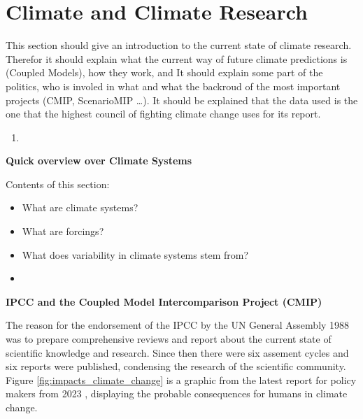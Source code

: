 \section{Climate and Climate Research}
\label{sec:climate}

This section should give an introduction to the current state of climate research. 
Therefor it should explain what the current way of future climate predictions is (Coupled Models), how they work, and 
It should explain some part of the politics, who is involed in what and what the backroud of the most important projects (CMIP, ScenarioMIP \dots). 
It should be explained that the data used is the one that the highest council of fighting climate change uses for its report. 

\begin{enumerate}
  \item
  
\end{enumerate}


\textbf{Quick overview over Climate Systems}

Contents of this section: 

\begin{itemize}
  \item What are climate systems? 
  \item What are forcings? 
  \item What does variability in climate systems stem from?
  \item 
\end{itemize}




\textbf{IPCC and the Coupled Model Intercomparison Project (CMIP)}


The reason for the endorsement of the IPCC by the UN General Assembly 1988 was to prepare comprehensive reviews and report about the current state of scientific knowledge and research. 
Since then there were six assement cycles and six reports were published, condensing the research of the scientific community. Figure \ref{fig:impacts_climate_change} is a graphic from the latest report for policy makers from 2023 \cite{lee2024climate}, displaying the probable consequences for humans in climate change.

